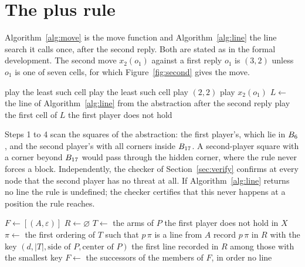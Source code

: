 \documentclass[11pt]{amsart}
\theoremstyle{definition}
\theoremstyle{remark}
\begin{document}
\section{The plus rule}\label{sec:rule}

Algorithm~\ref{alg:move} is the move function and
Algorithm~\ref{alg:line} the line search it calls once, after the
second reply. Both are stated as in the formal development. The second
move $x_2(o_1)$ against a first reply $o_1$ is $(3,2)$ unless $o_1$ is
one of seven cells, for which Figure~\ref{fig:second} gives the move.

\begin{algorithm}[H]
\caption{The move function.}\label{alg:move}
\begin{algorithmic}[1]
  \State play the least such cell
  \State play the least such cell
  \State play $(2,2)$
  \State play $x_2(o_1)$
\Else
  \State $L \gets$ the line of Algorithm~\ref{alg:line} from the
    abstraction after the second reply
  \State play the first cell of $L$ the first player does not hold
\EndIf
\end{algorithmic}
\end{algorithm}

Steps 1 to 4 scan the squares of the abstraction: the first player's,
which lie in $B_6$, and the second player's with all corners
inside $B_{17}$. A second-player square with a corner beyond
$B_{17}$ would pass through the hidden corner, where the rule never
forces a block. Independently, the checker of Section~\ref{sec:verify}
confirms at every node that the second player has no threat at all. If
Algorithm~\ref{alg:line} returns no line the rule is undefined; the
checker certifies that this never happens at a position the rule
reaches.

\begin{algorithm}[H]
\caption{The line search, from an abstract position $A$.}\label{alg:line}
\begin{algorithmic}[1]
\State $F \gets [(A, \varepsilon)]$
  \State $R \gets \varnothing$
      \State $T \gets$ the arms of $P$ the first player does not hold in $X$
        \State $\pi \gets$ the first ordering of $T$ such that $p\,\pi$ is a line from $A$
         record $p\,\pi$ in $R$ with the key $(d, |T|, \text{side of } P, \text{center of } P)$ \EndIf
      \EndIf
    \EndFor
  \EndFor
   \Return the first line recorded in $R$ among those with the smallest key \EndIf
  \State $F \gets$ the successors of the members of $F$, in order
\EndFor
\State \Return no line
\end{algorithmic}
\end{algorithm}
\end{document}
